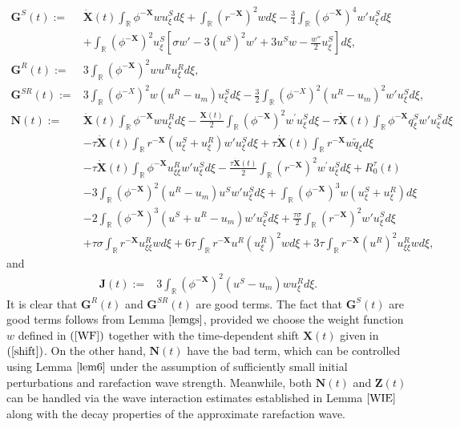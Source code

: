 \documentclass[10pt,reqno]{amsart}
\numberwithin{equation}{section}
\begin{document}
		\begin{align}
			\mathbf{G}^{S}(t) :=&\dot{\mathbf{X}}(t) \int_{\mathbb{R}} \phi^{-\mathbf{X}} w u_{\xi}^{S} d\xi+ \int_{\mathbb{R}}  (r^{-\mathbf{X}})^2w d\xi - \frac{3}{4} \int_{\mathbb{R}} (\phi^{-\mathbf{X}})^4 w' u_{\xi}^{S} d\xi\nonumber\\
			&+ \int_{\mathbb{R}} (\phi^{-\mathbf{X}})^2 u_{\xi}^{S} \left[\sigma w' - 3(u^{S})^2 w' + 3u^{S} w - \frac{w''}{2} u_{\xi}^{S}\right] d\xi
			,\label{GS}\\
			\mathbf{G}^{R}(t):=&3\int_{\mathbb{R}}(\phi^{-\mathbf{X}})^{2}wu^{R}u_{\xi}^{R}d\xi, \label{GR}\\
			\mathbf{G}^{SR}(t) := &3 \int_{\mathbb{R}} (\phi^{-X})^2 w(u^R - u_m) u_{\xi}^S d\xi - \frac{3}{2} \int_{\mathbb{R}} (\phi^{-X})^2 (u^R - u_m)^2 w' u_{\xi}^S d\xi,\label{GSR}\\
			\mathbf{N}(t):=&\dot{\mathbf{X}}(t) \int_{\mathbb{R}} \phi^{-\mathbf{X}} w u_{\xi}^{R} d\xi-\frac{\dot{\mathbf{X}}(t)}{2} \int_{\mathbb{R}}\left(\phi^{-\mathbf{X}}\right)^{2} w^{\prime} u_{\xi}^{S} d \xi-\tau\dot{\mathbf{X}}(t)\int_{\mathbb{R}}\phi^{-\mathbf{X}}q_{\xi}^{S}w'u_{\xi}^{S}d\xi\nonumber\\
			&-\tau\dot{\mathbf{X}}(t) \int_{\mathbb{R}}r^{-\mathbf{X}}\left(u_{\xi}^{S}+u_{\xi}^{R}\right)w'u_{\xi}^{S}d\xi+\tau\dot{\mathbf{X}}(t)\int_{\mathbb{R}}r^{-\mathbf{X}}w\tilde{q}_{\xi}d\xi\nonumber\\
			&-\tau\dot{\mathbf{X}}(t)\int_{\mathbb{R}}\phi^{-\mathbf{X}}u_{\xi\xi}^{R}w'u_{\xi}^{S}d\xi-\frac{\tau\dot{\mathbf{X}}(t)}{2}\int_{\mathbb{R}}\left(r^{-\mathbf{X}}\right)^{2} w^{\prime} u_{\xi}^{S} d \xi+R_0^{\tau}(t)\nonumber\\
			&-3\int_{\mathbb{R}}(\phi^{-\mathbf{X}})^2(u^R-u_{m})u^Sw'u_{\xi}^Sd\xi+\int_{\mathbb{R}}(\phi^{-\mathbf{X}})^3w(u_{\xi}^S+u_{\xi}^R)d\xi\nonumber\\
			&-2\int_{\mathbb{R}}(\phi^{-\mathbf{X}})^3(u^S+u^R-u_{m})w'u_{\xi}^Sd\xi+\frac{\tau\sigma}{2}\int_{\mathbb{R}}(r^{-\mathbf{X}})^2w'u_{\xi}^Sd\xi\nonumber\\
			&+\tau\sigma\int_{\mathbb{R}}r^{-\mathbf{X}}u_{\xi\xi}^Rwd\xi+6\tau\int_{\mathbb{R}}r^{-\mathbf{X}}u^R(u_{\xi}^R)^2wd\xi+3\tau\int_{\mathbb{R}}r^{-\mathbf{X}}(u^R)^2u_{\xi\xi}^Rwd\xi,
		\end{align}
		and
		\begin{align}\label{j}
			\mathbf{J}(t):=&3 \int_{\mathbb{R}} (\phi^{-\mathbf{X}})^2 (u^S - u_m) w u_\xi^R d\xi.
		\end{align}
			It is clear that $\mathbf{G}^R(t)$ and $\mathbf{G}^{SR}(t)$ are good terms. The fact that $\mathbf{G}^S(t)$ are good terms follows from Lemma $\ref{lemgs}$, provided we choose the weight function $w$ defined in $(\ref{WF})$ together with the time-dependent shift $\mathbf{X}(t)$ given in $(\ref{shift})$. On the other hand, $\mathbf{N}(t)$ have the bad term, which can be controlled using Lemma $\ref{lem6}$ under the assumption of sufficiently small initial perturbations and rarefaction wave strength. Meanwhile, both $\mathbf{N}(t)$ and $\mathbf{Z}(t)$ can be handled via the wave interaction estimates established in Lemma $\ref{WIE}$ along with the decay properties of the approximate rarefaction wave.
\end{document}
